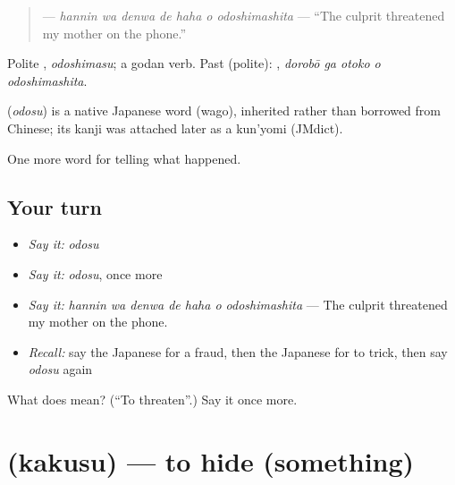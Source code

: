 \begin{quote}
\textbf{   } — \emph{hannin wa denwa de haha o odoshimashita} — \textquotedblleft{}The culprit threatened my mother on the phone.\textquotedblright{}
\end{quote}

Polite \textbf{}, \emph{odoshimasu}; a godan verb. Past (polite): \textbf{  }, \emph{dorobō ga otoko o odoshimashita}.

\begin{cousinweb}
\textbf{} (\emph{odosu}) is a native Japanese word (wago), inherited rather than borrowed from Chinese; its kanji was attached later as a kun'yomi (JMdict).
\end{cousinweb}

\begin{grammarlens}[title={What you've built}]
One more word for telling what happened.
\end{grammarlens}

\subsection*{Your turn}
\begin{itemize}
\raggedright
  \item \emph{Say it:} \emph{odosu}
  \item \emph{Say it:} \emph{odosu}, once more
  \item \emph{Say it:} \emph{hannin wa denwa de haha o odoshimashita} — The culprit threatened my mother on the phone.
  \item \emph{Recall:} say the Japanese for a fraud, then the Japanese for to trick, then say \emph{odosu} again
\end{itemize}

\begin{tcolorbox}[breakable,colback=teal!4,colframe=teal!35!black,title={Before you move on}]
What does  mean? (\textquotedblleft{}To threaten\textquotedblright{}.) Say it once more.
\end{tcolorbox}
\section[\texorpdfstring{\ja{かくす} (kakusu)}{かくす (kakusu)}]{ (kakusu) — to hide (something)}

\label{lesson:JA-C272-kakusu}



